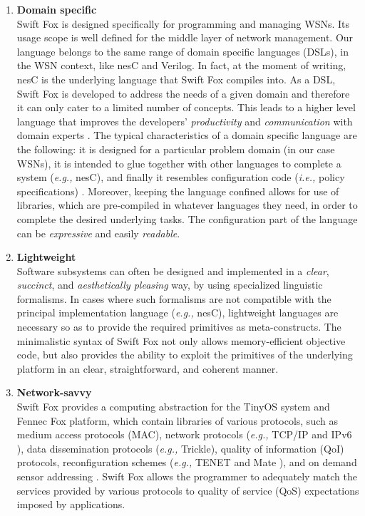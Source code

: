 \begin{enumerate}
	\item \textbf{Domain specific}		\\
	Swift Fox is designed specifically for programming and managing
	WSNs. Its usage scope is well defined for the middle layer of
	network management. Our language belongs to the same range of
	domain specific languages (DSLs), in the WSN context, like nesC and
	Verilog. In fact, at the moment of writing, nesC is the underlying 
	language that Swift Fox compiles into. As a DSL, Swift Fox is
	developed to address the needs of a given domain and therefore it
	can only cater to a limited number of concepts. This leads to a
	higher level language that improves the developers'
	\textit{productivity} and \textit{communication} with domain
	experts \cite{johan:online}. The typical characteristics of a
	domain specific language are the following: it is designed for a
	particular problem domain (in our case WSNs), it is intended to
	glue together with other languages to complete a system
	(\textit{e.g.,} nesC), and finally it resembles configuration code 
	(\textit{i.e.,} policy specifications) \cite{mfowler:online}.
	Moreover, keeping the language confined allows for use of
	libraries, which are pre-compiled in whatever languages they need,
	in order to complete the desired underlying tasks. The
	configuration part of the language can be \textit{expressive} and
	easily \textit{readable}. 

	\item \textbf{Lightweight}		\\
	Software subsystems can often be designed and implemented in a
	\textit{clear}, \textit{succinct}, and \textit{aesthetically
	pleasing} way, by using specialized linguistic formalisms. In cases
	where such formalisms are not compatible with the principal
	implementation language (\textit{e.g.,} nesC), lightweight
	languages \cite{dspinellis:1997} are necessary so as to provide the
	required primitives as meta-constructs. The minimalistic syntax of
	Swift Fox not only allows memory-efficient objective code, but also
	provides the ability to exploit the primitives of the underlying
	platform in an clear, straightforward, and coherent manner.

	\item \textbf{Network-savvy}		\\
	Swift Fox provides a computing abstraction for the TinyOS
	system and Fennec Fox platform, which contain libraries of various 
	protocols, such as medium access protocols (MAC), network protocols
	(\textit{e.g.,} TCP/IP \cite{dunkels:2003} and IPv6
	\cite{durvy:2008}), data dissemination protocols (\textit{e.g.,}
	Trickle\cite{levis:2004}), quality of information (QoI) protocols, 
	reconfiguration schemes (\textit{e.g.,} TENET \cite{gnawali:2006}
	and Mate \cite{levis:2002}), and on demand sensor addressing
	\cite{schurgers:2002}. Swift Fox allows the programmer to
	adequately match the services provided by various protocols to
	quality of service (QoS) expectations imposed by applications.


\end{enumerate}
